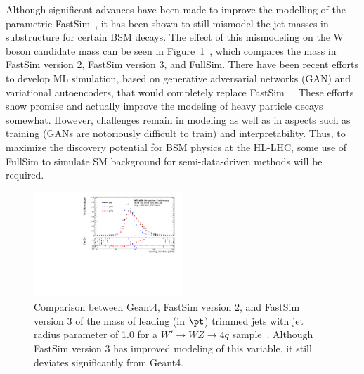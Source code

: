 \documentclass[letter, USenglish, 11pt, subfigure]{article}
\begin{document}
Although significant advances have been made to improve the modelling of the parametric FastSim~\cite{AF3vCHEP2021}, it has been shown to still mismodel the jet masses in substructure for certain BSM decays. The effect of this mismodeling on the W boson candidate mass can be seen in Figure~\ref{fig:wMass}~\cite{AF3vCHEP2021}, which compares the mass in FastSim version 2, FastSim version 3, and FullSim. There have been recent efforts to develop ML simulation, based on generative adversarial networks (GAN) and variational autoencoders, that would completely replace FastSim ~\cite{calogan,atlasgan}. These efforts show promise and actually improve the modeling of heavy particle decays somewhat. However, challenges remain in modeling as well as in aspects such as training (GANs are notoriously difficult to train) and interpretability. Thus, to maximize the discovery potential for BSM physics at the HL-LHC, some use of FullSim to simulate SM background for semi-data-driven methods will be required. 

\begin{figure}
  \centering
  \includegraphics[width=0.5\textwidth]{figures/af3_jetmassR10.pdf}
  \caption{\label{fig:wMass} Comparison between Geant4, FastSim version 2, and FastSim version 3 of the mass of leading (in $\pt$) trimmed jets with jet radius parameter of 1.0 for a $W'\to WZ \to 4q$ sample~\cite{AF3vCHEP2021}. Although FastSim version 3 has improved modeling of this variable, it still deviates significantly from Geant4. }
\end{figure}
\end{document}
